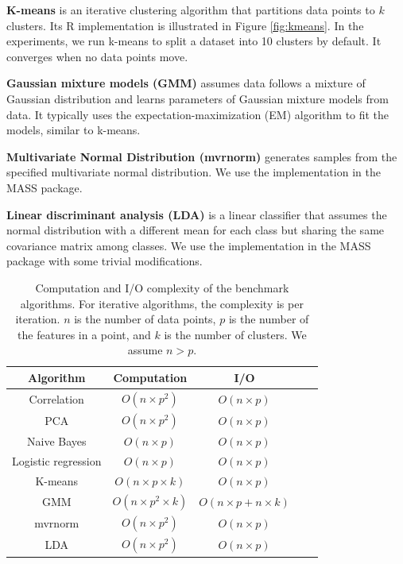 \noindent \textbf{K-means} is an iterative clustering algorithm that
partitions data points to $k$ clusters. Its R implementation is illustrated
in Figure \ref{fig:kmeans}. In the experiments, we run k-means to split
a dataset into 10 clusters by default. It converges when no data points
move.

\noindent \textbf{Gaussian mixture models (GMM)} assumes data follows
a mixture of Gaussian distribution and learns parameters of Gaussian mixture
models from data. It typically uses the expectation-maximization (EM)
algorithm \cite{em} to fit the models, similar to k-means.

\noindent \textbf{Multivariate Normal Distribution (mvrnorm)} generates
samples from the specified multivariate normal distribution. We use
the implementation in the MASS package.

\noindent \textbf{Linear discriminant analysis (LDA)} is a linear classifier
that assumes the normal distribution with a different mean for each class
but sharing the same covariance matrix among classes. We use the implementation
in the MASS package with some trivial modifications.


\begin{table}
\begin{center}
\caption{Computation and I/O complexity of the benchmark algorithms. For
	iterative algorithms, the complexity is per iteration. $n$ is the number
	of data points, $p$ is the number of the features in a point, and $k$ is
	the number of clusters. We assume $n > p$.
}
\vspace{-10pt}
\footnotesize
\begin{tabular}{|c|c|c|c|c|}
\hline
Algorithm & Computation & I/O \\
\hline
Correlation & $O(n \times p^2)$ & $O(n \times p)$ \\
\hline
PCA & $O(n \times p^2)$ & $O(n \times p)$ \\
\hline
Naive Bayes & $O(n \times p)$ & $O(n \times p)$ \\
\hline
Logistic regression & $O(n \times p)$ & $O(n \times p)$ \\
\hline
K-means & $O(n \times p \times k)$ & $O(n \times p)$ \\
\hline
GMM & $O(n \times p^2 \times k)$ & $O(n \times p + n \times k)$ \\
\hline
mvrnorm & $O(n \times p^2)$ & $O(n \times p)$ \\
\hline
LDA & $O(n \times p^2)$ & $O(n \times p)$ \\
\hline
\end{tabular}
\normalsize
\label{tbl:algs}
\end{center}
\vspace{-10pt}
\end{table}


